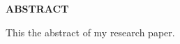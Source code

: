
\newenvironment{myabstract}
{%
    \thispagestyle{empty}%
    \vspace*{\stretch{2}}%
    \justifying      %
}
{\par %
    \vspace{\stretch{3}} %
    \clearpage           %
}

\chapter*{}
\begin{myabstract}
    \begin{center}
        {\textbf{ABSTRACT}}
    \end{center}
    This the abstract of my research paper.
\end{myabstract}
